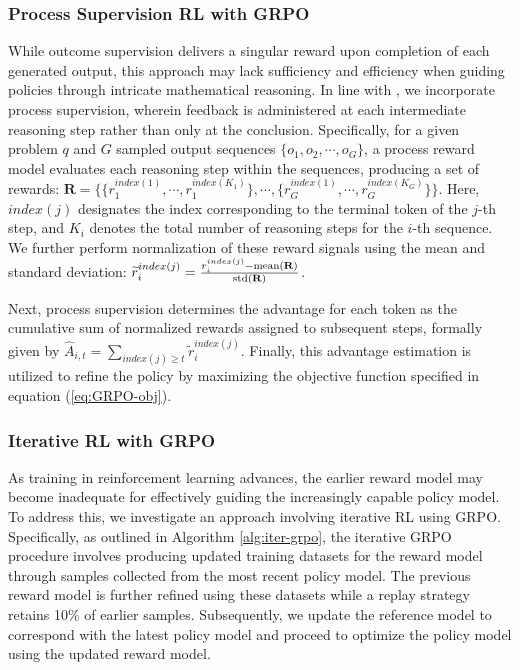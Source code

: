 \begin{itemize}[topsep=0pt]
\begin{itemize}[topsep=0pt]
\subsubsection{Process Supervision RL with GRPO} While outcome supervision delivers a singular reward upon completion of each generated output, this approach may lack sufficiency and efficiency when guiding policies through intricate mathematical reasoning. In line with \cite{wang2023math}, we incorporate process supervision, wherein feedback is administered at each intermediate reasoning step rather than only at the conclusion. Specifically, for a given problem $q$ and $G$ sampled output sequences $\{o_1, o_2, \cdots, o_G\}$, a process reward model evaluates each reasoning step within the sequences, producing a set of rewards: $\mathbf{R} = \{ \{r_1^{index(1)},\cdots,r_1^{index(K_1)}\}, \cdots,  \{r_G^{index(1)},\cdots,r_G^{index(K_G)}\} \}$. Here, $index(j)$ designates the index corresponding to the terminal token of the $j$-th step, and $K_i$ denotes the total number of reasoning steps for the $i$-th sequence. We further perform normalization of these reward signals using the mean and standard deviation: $\widetilde{r}_i^{index(j)} = \frac{r_i^{index(j)} - {\rm mean(\mathbf{R})}}{{\rm std(\mathbf{R})}}$.

Next, process supervision determines the advantage for each token as the cumulative sum of normalized rewards assigned to subsequent steps, formally given by $\hat{A}_{i, t} = \sum_{index(j) \ge t} \widetilde{r}_i^{index(j)}$. Finally, this advantage estimation is utilized to refine the policy by maximizing the objective function specified in equation (\ref{eq:GRPO-obj}).

\subsubsection{Iterative RL with GRPO} As training in reinforcement learning advances, the earlier reward model may become inadequate for effectively guiding the increasingly capable policy model. To address this, we investigate an approach involving iterative RL using GRPO. Specifically, as outlined in Algorithm \ref{alg:iter-grpo}, the iterative GRPO procedure involves producing updated training datasets for the reward model through samples collected from the most recent policy model. The previous reward model is further refined using these datasets while a replay strategy retains 10\% of earlier samples. Subsequently, we update the reference model to correspond with the latest policy model and proceed to optimize the policy model using the updated reward model.


\end{itemize}
\end{itemize}
